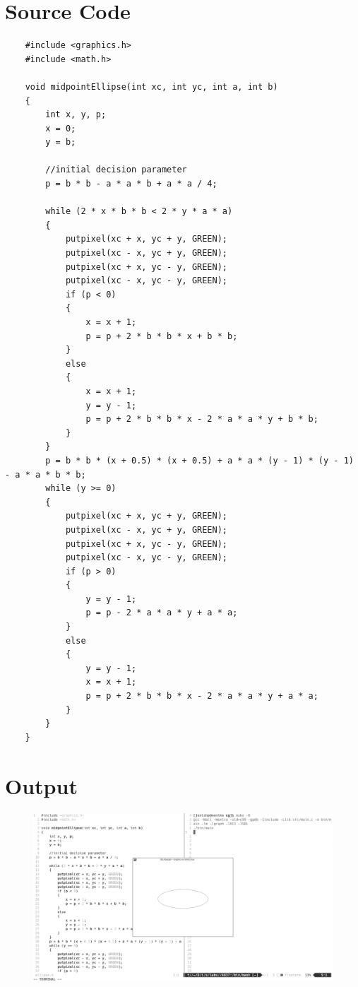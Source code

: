 \documentclass[12pt]{article}
\begin{document}
	\section{Source Code}
	\begin{verbatim}
	#include <graphics.h>
	#include <math.h>
	
	void midpointEllipse(int xc, int yc, int a, int b)
	{
	    int x, y, p;
	    x = 0;
	    y = b;
	
	    //initial decision parameter
	    p = b * b - a * a * b + a * a / 4;
	
	    while (2 * x * b * b < 2 * y * a * a)
	    {
	        putpixel(xc + x, yc + y, GREEN);
	        putpixel(xc - x, yc + y, GREEN);
	        putpixel(xc + x, yc - y, GREEN);
	        putpixel(xc - x, yc - y, GREEN);
	        if (p < 0)
	        {
	            x = x + 1;
	            p = p + 2 * b * b * x + b * b;
	        }
	        else
	        {
	            x = x + 1;
	            y = y - 1;
	            p = p + 2 * b * b * x - 2 * a * a * y + b * b;
	        }
	    }
	    p = b * b * (x + 0.5) * (x + 0.5) + a * a * (y - 1) * (y - 1) - a * a * b * b;
	    while (y >= 0)
	    {
	        putpixel(xc + x, yc + y, GREEN);
	        putpixel(xc - x, yc + y, GREEN);
	        putpixel(xc + x, yc - y, GREEN);
	        putpixel(xc - x, yc - y, GREEN);
	        if (p > 0)
	        {
	            y = y - 1;
	            p = p - 2 * a * a * y + a * a;
	        }
	        else
	        {
	            y = y - 1;
	            x = x + 1;
	            p = p + 2 * b * b * x - 2 * a * a * y + a * a;
	        }
	    }
	}

	\end{verbatim}
	\section{Output}

	\begin{figure}[!h]
		\hspace*{-1cm}
		\centering
		\includegraphics[width=1.01\linewidth]{output3.png}
		\caption{}
		\label{fig:}
	\end{figure}
\end{document}
